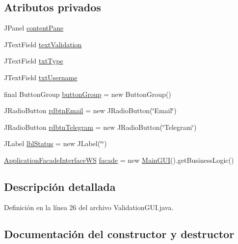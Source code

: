 \subsection*{Atributos privados}
\begin{DoxyCompactItemize}
\item 
J\+Panel \mbox{\hyperlink{classgui_1_1_validation_g_u_i_aef9acb4c0cb38c01fbf8ea562474335a}{content\+Pane}}
\item 
J\+Text\+Field \mbox{\hyperlink{classgui_1_1_validation_g_u_i_a0b6679a6247a162176dadd092fbd9bd2}{text\+Validation}}
\item 
J\+Text\+Field \mbox{\hyperlink{classgui_1_1_validation_g_u_i_aa8db43a7c80fcde4ced14b40c8a92920}{txt\+Type}}
\item 
J\+Text\+Field \mbox{\hyperlink{classgui_1_1_validation_g_u_i_a5d0148dc1550e58e9497c1897189c07c}{txt\+Username}}
\item 
final Button\+Group \mbox{\hyperlink{classgui_1_1_validation_g_u_i_a1908256eb6e291cba709b035ec08333a}{button\+Group}} = new Button\+Group()
\item 
J\+Radio\+Button \mbox{\hyperlink{classgui_1_1_validation_g_u_i_a863272c906d3d0db5e2d015d0793fe0a}{rdbtn\+Email}} = new J\+Radio\+Button(\char`\"{}Email\char`\"{})
\item 
J\+Radio\+Button \mbox{\hyperlink{classgui_1_1_validation_g_u_i_a440c0ddbf9342ed8d877847800ab4182}{rdbtn\+Telegram}} = new J\+Radio\+Button(\char`\"{}Telegram\char`\"{})
\item 
J\+Label \mbox{\hyperlink{classgui_1_1_validation_g_u_i_ae54db9df71d22bf4b59706bdab55511b}{lbl\+Status}} = new J\+Label(\char`\"{}\char`\"{})
\item 
\mbox{\hyperlink{interfacebusiness_logic_1_1_application_facade_interface_w_s}{Application\+Facade\+Interface\+WS}} \mbox{\hyperlink{classgui_1_1_validation_g_u_i_af2cb3e3d7bab33150dca01f640cdb824}{facade}} = new \mbox{\hyperlink{classgui_1_1_main_g_u_i}{Main\+G\+UI}}().get\+Business\+Logic()
\end{DoxyCompactItemize}


\subsection{Descripción detallada}


Definición en la línea 26 del archivo Validation\+G\+U\+I.\+java.



\subsection{Documentación del constructor y destructor}
\mbox{\label{classgui_1_1_validation_g_u_i_a090f7d6cae6f5d31fde54362355d47ac}} 
